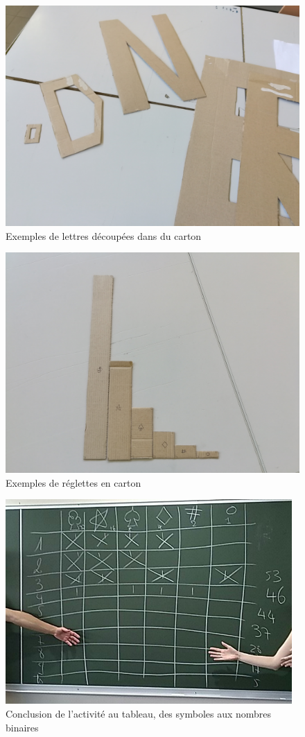 \documentclass[a4paper,12pt]{scrartcl}
\begin{document}
\begin{figure}[h]
\begin{center}
\includegraphics[width=0.7\linewidth]{images/lettres.jpg} 
\end{center}
\caption{Exemples de lettres découpées dans du carton}
\label{fig:lettres}
\end{figure}

\begin{figure}
\begin{center}
\includegraphics[width=0.7\linewidth]{images/reglettes.jpg} 
\end{center}
\caption{Exemples de réglettes en carton}
\label{fig:reglettes}
\end{figure}

\begin{figure}
\begin{center}
\includegraphics[width=0.7\linewidth]{images/tableau.png}
\end{center}
\caption{Conclusion de l'activité au tableau, des symboles aux nombres binaires}
\label{fig:photo}
\end{figure}
\end{document}
